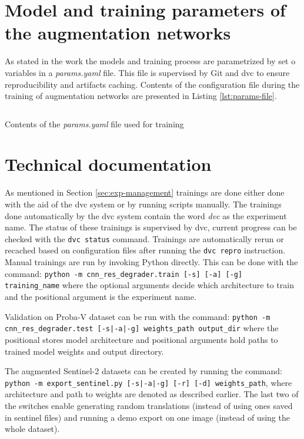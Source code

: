 \chapter{Model and training parameters of the augmentation networks}
\label{ch:appendix-params}
As stated in the work the models and training process are parametrized by set o variables in a \textit{params.yaml} file.
This file is supervised by Git and \gls{dvc} to ensure reproducibility and artifacts caching.
Contents of the configuration file during the training of augmentation networks are presented in Listing \ref{lst:params-file}.
\begin{longlisting}
\inputminted{yaml}{listings/params.yaml}
\caption{Contents of the \textit{params.yaml} file used for training}
\label{lst:params-file}
\end{longlisting}

\chapter{Technical documentation}
\label{ch:appendix-technical}
As mentioned in Section \ref{sec:exp-management} trainings are done either done with the aid of the \gls{dvc} system or by running scripts manually.
The trainings done automatically by the \gls{dvc} system contain the word \textit{dvc} as the experiment name.
The status of these trainings is supervised by \gls{dvc}, current progress can be checked with the \texttt{dvc status} command.
Trainings are automatically rerun or recached based on configuration files after running the \texttt{dvc repro} instruction.
Manual trainings are run by invoking Python directly.
This can be done with the command: \texttt{python -m cnn_res_degrader.train [-s] [-a] [-g] training_name} where the optional arguments decide which architecture to train and the positional argument is the experiment name.

Validation on Proba-V dataset can be run with the command: \texttt{python -m cnn_res_degrader.test [-s|-a|-g] weights_path output_dir} where the positional stores model architecture and positional arguments hold paths to trained model weights and output directory.

The augmented Sentinel-2 datasets can be created by running the command: \texttt{python -m export_sentinel.py [-s|-a|-g] [-r] [-d] weights_path}, where architecture and path to weights are denoted as described earlier.
The last two of the switches enable generating random translations (instead of using ones saved in sentinel files) and running a demo export on one image (instead of using the whole dataset).